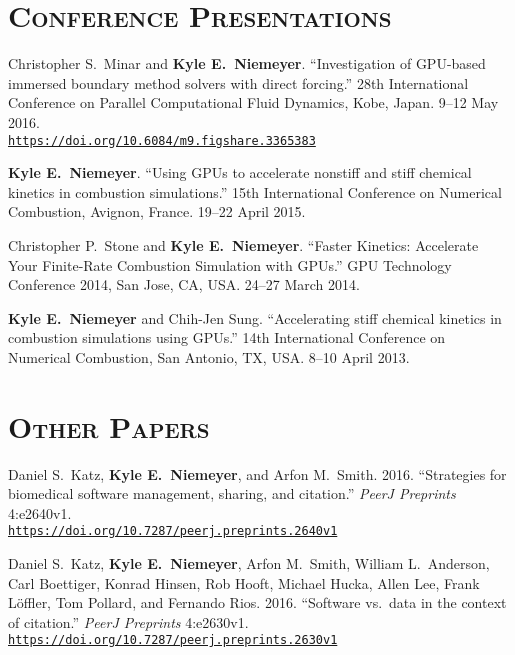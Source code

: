 \documentclass[margin,line,11pt]{res}
\makeatletter
\newlength{\bibhang}
\newlength{\bibsep}
 {\@listi \global\bibsep\itemsep \global\advance\bibsep by\parsep}
\newenvironment{bibenum*}
  {\renewcommand\labelenumi{\theenumi.}%
   \etaremune[
     topsep=0pt,
     itemsep=\bibsep,
     parsep=0pt,partopsep=0pt,
     itemindent=-\bibhang,
     leftmargin={\bibhang+\widthof{[999]}}]}
  {\endetaremune}
\newcommand*{\doi}[1]{\href{https://doi.org/#1}{\nolinkurl{https://doi.org/#1}}}
\makeatother
\begin{document}
\begin{resume}
\section{\textsc{Conference Presentations}}

\begin{bibenum*}

\item Christopher S.\ Minar and \textbf{Kyle E.\ Niemeyer}. ``Investigation of GPU-based immersed boundary method solvers with direct forcing.''
28th International Conference on Parallel Computational Fluid Dynamics, Kobe, Japan.
9--12 May 2016. \\
\doi{10.6084/m9.figshare.3365383}

\item \textbf{Kyle E.\ Niemeyer}.
``Using GPUs to accelerate nonstiff and stiff chemical kinetics in combustion simulations.''
15th International Conference on Numerical Combustion, Avignon, France.
19--22 April 2015.

\item Christopher P.\ Stone and \textbf{Kyle E.\ Niemeyer}.
``Faster Kinetics: Accelerate Your Finite-Rate Combustion Simulation with GPUs.''
GPU Technology Conference 2014, San Jose, CA, USA.
24--27 March 2014.

\item \textbf{Kyle E.\ Niemeyer} and Chih-Jen Sung.
``Accelerating stiff chemical kinetics in combustion simulations using GPUs.''
14th International Conference on Numerical Combustion, San Antonio, TX, USA.
8--10 April 2013.

\end{bibenum*}

\section{\textsc{Other Papers}}

\begin{bibenum*}

\item Daniel S.\ Katz, \textbf{Kyle E.\ Niemeyer}, and Arfon M.\ Smith.
2016.
``Strategies for biomedical software management, sharing, and citation.''
\textit{PeerJ Preprints} 4:e2640v1. \\
\doi{10.7287/peerj.preprints.2640v1}

\item Daniel S.\ Katz, \textbf{Kyle E.\ Niemeyer}, Arfon M.\ Smith, William L.\ Anderson,
Carl Boettiger, Konrad Hinsen, Rob Hooft, Michael Hucka, Allen Lee, Frank Löffler,
Tom Pollard, and Fernando Rios.
2016.
``Software vs.\ data in the context of citation.''
\textit{PeerJ Preprints} 4:e2630v1.
\doi{10.7287/peerj.preprints.2630v1}


\end{bibenum*}
\end{resume}
\end{document}

